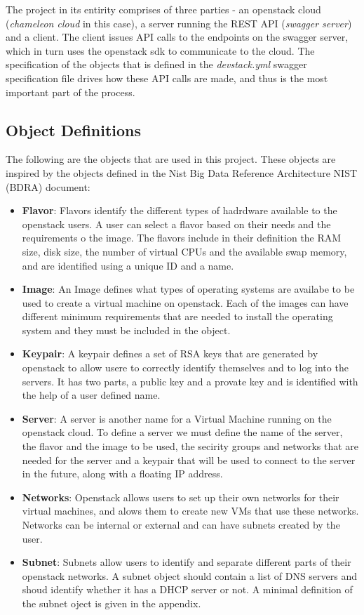 The project in its entirity comprises of three parties - an openstack
cloud (\emph{chameleon cloud} in this case), a server running the REST
API (\emph{swagger server}) and a client. The client issues API calls
to the endpoints on the swagger server, which in turn uses the
openstack sdk to communicate to the cloud. The specification of the
objects that is defined in the \emph{devstack.yml} swagger
specification file drives how these API calls are made, and thus is
the most important part of the process.

\subsection{Object Definitions}
The following are the objects that are used in this project. These
objects are inspired by the objects defined in the Nist Big Data
Reference Architecture NIST (BDRA) document:

\begin{itemize}
\item \textbf{Flavor}: Flavors identify the different types of hadrdware
available to the openstack users. A user can select a flavor based on
their needs and the requirements o the image. The flavors include in
their definition the RAM size, disk size, the number of virtual CPUs
and the available swap memory, and are identified using a unique ID
and a name.

\item \textbf{Image}: An Image defines what types of operating systems are
availabe to be used to create a virtual machine on openstack. Each of
the images can have different minimum requirements that are needed to
install the operating system and they must be included in the
object. 

\item \textbf{Keypair}: A keypair defines a set of RSA keys that are
generated by openstack to allow usere to correctly identify themselves
and to log into the servers. It has two parts, a public key and a
provate key and is identified with the help of a user defined
name. 

\item \textbf{Server}: A server is another name for a Virtual Machine
running on the openstack cloud. To define a server we must define the
name of the server, the flavor and the image to be used, the secirity
groups and networks that are needed for the server and a keypair that
will be used to connect to the server in the future, along with a
floating IP address. 
\item \textbf{Networks}: Openstack allows users to set up their own
networks for their virtual machines, and alows them to create new VMs
that use these networks. Networks can be internal or external and can
have subnets created by the user.

\item \textbf{Subnet}: Subnets allow users to identify and separate
different parts of their openstack networks. A subnet object should
contain a list of DNS servers and shoud identify whether it has a DHCP
server or not.  A minimal definition of the subnet oject is given in
the appendix.
\end{itemize}

